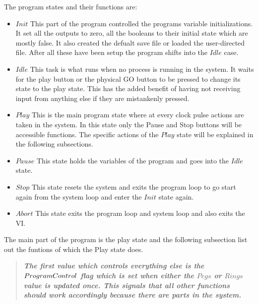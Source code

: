 \documentclass[12pt]{article}
\begin{document}
  The program states and their functions are:
  \begin{itemize}
    \item $Init$
      This part of the program controlled the programs variable initializations. It set all the outputs to
      zero, all the booleans to their initial state which are mostly false. It also created the defualt save file
      or loaded the user-directed file. After all these have been setup the program shifts into the $Idle$ case.
    \item $Idle$
      This task is what runs when no process is running in the system. It waits for the play button or the physical
      GO button to be pressed to change its state to the play state. This has the added benefit of having not
      receiving input from anything else if they are mistankenly pressed.
    \item $Play$
      This is the main program state where at every clock pulse actions are taken in the system.
      In this state only the Pause and Stop buttons will be accessible functions. The specific actions
      of the $Play$ state will be explained in the following subsections.
    \item $Pause$
      This state holds the variables of the program and goes into the $Idle$ state.
    \item $Stop$
      This state resets the system and exits the program loop to go start again from the system loop and enter the
      $Init$ state again.
    \item $Abort$
      This state exits the program loop and system loop and also exits the VI.
  \end{itemize}

  The main part of the program is the play state and the following subsection list out the funtions of which the Play
  state does.

  \begin{quote}
    \textbf{\textit{
    The first value which controls everything else is the $Program\-Control$ flag which is set when
    either the $Pegs$ or $Rings$ value is updated once. This signals that all other functions
    should work accordingly because there are parts in the system.}}
  \end{quote}
\end{document}
